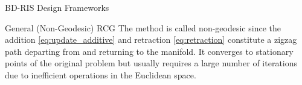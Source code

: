 \begin{section}{BD-RIS Design Frameworks}
\begin{subsection}{General (Non-Geodesic) RCG}
	The method is called non-geodesic since the addition \eqref{eq:update_additive} and retraction \eqref{eq:retraction} constitute a zigzag path departing from and returning to the manifold.
	It converges to stationary points of the original problem but usually requires a large number of iterations due to inefficient operations in the Euclidean space.
\end{subsection}



\end{section}
